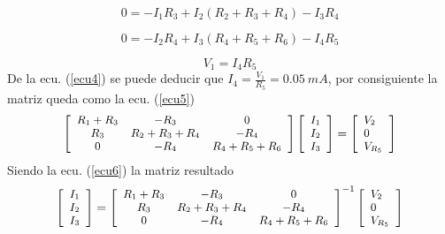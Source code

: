 \documentclass[twocolumn]{IEEEtran}
\begin{document}
\begin{equation}
 0 =  - {I_1}{R_3} + {I_2}\left( {{R_2} + {R_3} + {R_4}} \right) - {I_3}{R_4}
\label{ecu2}
\end{equation}

\begin{equation}
 0 =  - {I_2}{R_4} + {I_3}\left( {{R_4} + {R_5} + {R_6}} \right) - {I_4}{R_5}
\label{ecu3}
\end{equation}

\begin{equation}
 {V_1} = {I_4}{R_5}
\label{ecu4}
\end{equation}
\noindent
De la ecu. (\ref{ecu4}) se puede deducir que $I_4 = \frac{V_1}{R_5} = 0.05 \ mA$, por consiguiente la matriz queda como la ecu. (\ref{ecu5})
\begin{equation}
\footnotesize
\left[ {\begin{array}{*{20}{c}}
   {{R_1} + {R_3}} & { - {R_3}} & 0  \\
   {{R_3}} & {{R_2} + {R_3} + {R_4}} & { - {R_4}}  \\
   0 & { - {R_4}} & {{R_4} + {R_5} + {R_6}}  \\
\end{array}} \right]\left[ \begin{array}{l}
 {I_1} \\ 
 {I_2} \\ 
 {I_3} \\ 
 \end{array} \right] = \left[ \begin{array}{l}
 {V_2} \\ 
 0 \\ 
 V_{R_5} \\ 
 \end{array} \right]
\label{ecu5}
\end{equation}
\noindent
Siendo la ecu. (\ref{ecu6}) la matriz resultado
\begin{equation}
\footnotesize
 \left[ \begin{array}{l}
 {I_1} \\ 
 {I_2} \\ 
 {I_3} \\ 
 \end{array} \right] = {\left[ {\begin{array}{*{20}{c}}
   {{R_1} + {R_3}} & { - {R_3}} & 0  \\
   {{R_3}} & {{R_2} + {R_3} + {R_4}} & { - {R_4}}  \\
   0 & { - {R_4}} & {{R_4} + {R_5} + {R_6}}  \\
\end{array}} \right]^{ - 1}}\left[ \begin{array}{l}
 {V_2} \\ 
 0 \\ 
 V_{R_5} \\ 
 \end{array} \right]
\label{ecu6}
\end{equation}
\end{document}
